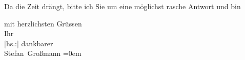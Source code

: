 \pstart
           {\pb}Da die Zeit drängt, bitte ich Sie um eine
               möglichst rasche Antwort und bin\pend
           
\pstart
           mit herzlichsten Grüssen{\\[\baselineskip]}Ihr{\\[\baselineskip]}{[}hs.:{]} dankbarer{\\[\baselineskip]}\spacefill\mbox{Stefan Großmann}\pend
           \leftskip=0em{}\endnumbering{}  \newcommand{\dateiname}{L02378}\newcommand{\titel}{Stefan Großmann an Arthur Schnitzler, 26. 4. 1922}\newcommand{\editorInnen}{Herausgegeben von Martin Anton Müller}
